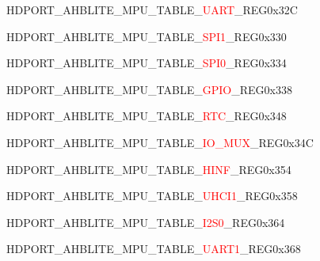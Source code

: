 \begin{register}{H}{DPORT\_AHBLITE\_MPU\_TABLE\_\textcolor{red}{UART}\_REG}{0x32C}\label{regdesc:AHBLITEMPUTABLEUARTREG}
\end{register}
\vspace{-3em}
\begin{register}{H}{DPORT\_AHBLITE\_MPU\_TABLE\_\textcolor{red}{SPI1}\_REG}{0x330}\label{regdesc:AHBLITEMPUTABLESPI1REG}
\end{register}
\vspace{-3em}
\begin{register}{H}{DPORT\_AHBLITE\_MPU\_TABLE\_\textcolor{red}{SPI0}\_REG}{0x334}\label{regdesc:AHBLITEMPUTABLESPI0REG}
\end{register}
\vspace{-3em}
\begin{register}{H}{DPORT\_AHBLITE\_MPU\_TABLE\_\textcolor{red}{GPIO}\_REG}{0x338}\label{regdesc:AHBLITEMPUTABLEGPIOREG}
\end{register}
\vspace{-3em}
\begin{register}{H}{DPORT\_AHBLITE\_MPU\_TABLE\_\textcolor{red}{RTC}\_REG}{0x348}\label{regdesc:AHBLITEMPUTABLERTCREG}
\end{register}
\vspace{-3em}
\begin{register}{H}{DPORT\_AHBLITE\_MPU\_TABLE\_\textcolor{red}{IO\_MUX}\_REG}{0x34C}\label{regdesc:AHBLITEMPUTABLEIOMUXREG}
\end{register}
\vspace{-3em}
\begin{register}{H}{DPORT\_AHBLITE\_MPU\_TABLE\_\textcolor{red}{HINF}\_REG}{0x354}\label{regdesc:AHBLITEMPUTABLEHINFREG}
\end{register}
\vspace{-3em}
\begin{register}{H}{DPORT\_AHBLITE\_MPU\_TABLE\_\textcolor{red}{UHCI1}\_REG}{0x358}\label{regdesc:AHBLITEMPUTABLEUHCI1REG}
\end{register}
\vspace{-3em}
\begin{register}{H}{DPORT\_AHBLITE\_MPU\_TABLE\_\textcolor{red}{I2S0}\_REG}{0x364}\label{regdesc:AHBLITEMPUTABLEI2S0REG}
\end{register}
\vspace{-3em}
\begin{register}{H}{DPORT\_AHBLITE\_MPU\_TABLE\_\textcolor{red}{UART1}\_REG}{0x368}\label{regdesc:AHBLITEMPUTABLEUART1REG}
\end{register}
